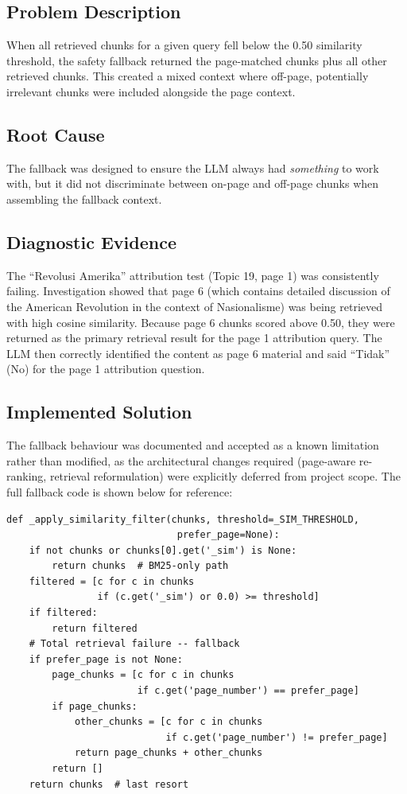 \documentclass[12pt, a4paper]{report}
\begin{document}
\subsection{Problem Description}

When all retrieved chunks for a given query fell below the 0.50 similarity
threshold, the safety fallback returned the page-matched chunks plus all
other retrieved chunks. This created a mixed context where off-page, potentially
irrelevant chunks were included alongside the page context.

\subsection{Root Cause}

The fallback was designed to ensure the LLM always had \emph{something} to work
with, but it did not discriminate between on-page and off-page chunks when
assembling the fallback context.

\subsection{Diagnostic Evidence}

The ``Revolusi Amerika'' attribution test (Topic 19, page 1) was consistently
failing. Investigation showed that page 6 (which contains detailed discussion
of the American Revolution in the context of Nasionalisme) was being retrieved
with high cosine similarity. Because page 6 chunks scored above 0.50, they
were returned as the primary retrieval result for the page 1 attribution query.
The LLM then correctly identified the content as page 6 material and said
``Tidak'' (No) for the page 1 attribution question.

\subsection{Implemented Solution}

The fallback behaviour was documented and accepted as a known limitation rather
than modified, as the architectural changes required (page-aware re-ranking,
retrieval reformulation) were explicitly deferred from project scope. The full
fallback code is shown below for reference:

\begin{lstlisting}[caption={RC-5 safety fallback in tutor\_service.py},
                   label={lst:rc5}]
def _apply_similarity_filter(chunks, threshold=_SIM_THRESHOLD,
                              prefer_page=None):
    if not chunks or chunks[0].get('_sim') is None:
        return chunks  # BM25-only path
    filtered = [c for c in chunks
                if (c.get('_sim') or 0.0) >= threshold]
    if filtered:
        return filtered
    # Total retrieval failure -- fallback
    if prefer_page is not None:
        page_chunks = [c for c in chunks
                       if c.get('page_number') == prefer_page]
        if page_chunks:
            other_chunks = [c for c in chunks
                            if c.get('page_number') != prefer_page]
            return page_chunks + other_chunks
        return []
    return chunks  # last resort
\end{lstlisting}
\end{document}

